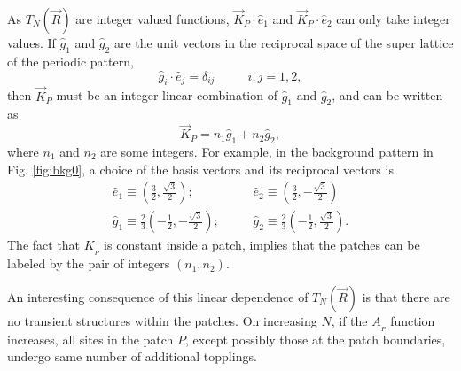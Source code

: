 \documentclass[11pt,a4paper]{book}
\begin{document}
As $T_{N}( \vec R )$ are integer valued functions,
$\vec K_{P}\cdot \hat{e}_{1}$ and
$\vec K_{P}\cdot\hat{e}_{2}$ can only take integer values. If
$\hat{g}_{1}$ and $\hat{g}_{2}$ are the unit vectors in the reciprocal
space of the super lattice of the periodic pattern,
\begin{equation}
\hat{g}_{i}\cdot\hat{e}_{j}=\delta_{ij}\textrm{~ ~ ~ ~ }i,j=1,2,
\end{equation}
then $\vec K_{P}$ must be an integer linear combination of
$\hat{g}_{1}$ and $\hat{g}_{2}$, and can be written as
\begin{equation}
\vec K_{P}=n_1 \hat{g}_{1}+ n_2 \hat{g}_{2},
\label{eq:recp1}
\end{equation}
where $n_1$ and $n_2$ are some integers. For example, in the background
pattern in Fig. \ref{fig:bkg0}, a choice
of the basis vectors and its reciprocal vectors is
\begin{eqnarray}
\hat{e}_{1}\equiv\left( \frac{3}{2}, \frac{\sqrt{3}}{2}
\right);&&\mathrm{ ~ ~ ~ ~ ~   }
\hat{e}_{2}\equiv\left( \frac{3}{2}, -\frac{\sqrt{3}}{2}  \right)
\nonumber\\
\hat{g}_{1}\equiv\frac{2}{3}\left( -\frac{1}{2},
-\frac{\sqrt{3}}{2} \right);&&\mathrm{ ~ ~ ~ ~ ~   }
\hat{g}_{2}\equiv\frac{2}{3}\left( -\frac{1}{2},\frac{\sqrt{3}}{2} \right).
\label{eq:recp}
\end{eqnarray}
The fact that $K_{_P}$ is constant
inside a patch, implies that the patches can be labeled by the pair
of integers $\left( n_1, n_2 \right)$.

An interesting consequence of this
linear dependence of $T_{N}( \vec R )$ is that there are no transient structures within
the patches. On increasing $N$, if the $A_{_P}$ function
increases, all sites in the patch $P$, except possibly those at the patch
boundaries, undergo same number of additional
topplings.
\end{document}
